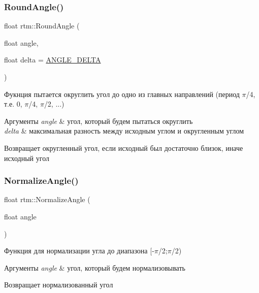 \subsubsection{\texorpdfstring{Round\+Angle()}{RoundAngle()}}
{\footnotesize\ttfamily float rtm\+::\+Round\+Angle (\begin{DoxyParamCaption}\item[{float}]{angle,  }\item[{float}]{delta = {\ttfamily \hyperlink{namespacertm_ac78c5105838adb58682cb69a4c66efd7}{A\+N\+G\+L\+E\+\_\+\+D\+E\+L\+TA}} }\end{DoxyParamCaption})}

Фукнция пытается округлить угол до одно из главных направлений (период {$\pi$}/4, т.\+е. 0, {$\pi$}/4, {$\pi$}/2, ...) 
\begin{DoxyParams}{Аргументы}
{\em angle} & угол, который будем пытаться округлить \\
\hline
{\em delta} & максимальная разность между исходным углом и округленным углом \\
\hline
\end{DoxyParams}
\begin{DoxyReturn}{Возвращает}
округленный угол, если исходный был достаточно близок, иначе исходный угол 
\end{DoxyReturn}
\mbox{\label{namespacertm_a72a57dbe581a6743525e1920296d42fe}} 
\subsubsection{\texorpdfstring{Normalize\+Angle()}{NormalizeAngle()}}
{\footnotesize\ttfamily float rtm\+::\+Normalize\+Angle (\begin{DoxyParamCaption}\item[{float}]{angle }\end{DoxyParamCaption})}

Функция для нормализации угла до диапазона \mbox{[}-\/{$\pi$}/2;{$\pi$}/2) 
\begin{DoxyParams}{Аргументы}
{\em angle} & угол, который будем нормализовывать \\
\hline
\end{DoxyParams}
\begin{DoxyReturn}{Возвращает}
нормализованный угол 
\end{DoxyReturn}
\mbox{\label{namespacertm_a390df6b8bc4a01befd946155150db744}} 

